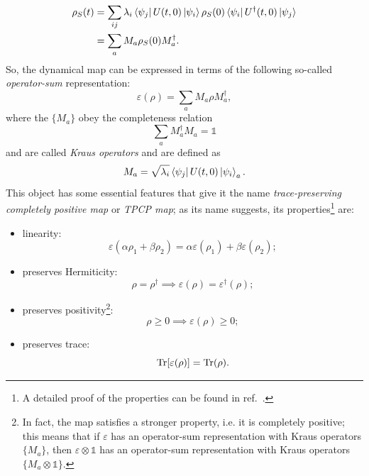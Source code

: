 \begin{equation}
\begin{split}
    \rho_S(t) &= \sum_{ij} \lambda_i \bra{\psi_j}U(t,0)\ket{\psi_i}\rho_S(0) \bra{\psi_i}U^\dagger(t,0)\ket{\psi_j}\\
                &= \sum_a M_a \rho_S(0) M_a^\dagger.
\end{split}
\end{equation}
So, the dynamical map can be expressed in terms of the following so-called \emph{operator-sum} representation:
\begin{equation}
    \varepsilon(\rho) = \sum_a M_a \rho M_a^\dagger,
\end{equation}
where the $\{M_a\}$ obey the completeness relation
\begin{equation}
\label{compl_rel_kraus}
    \sum_a M_a^\dagger M_a = \mathds{1}
\end{equation}
and are called \emph{Kraus operators} and are defined as
\begin{equation}
    M_a = \sqrt{\lambda_i} \bra{\psi_j}U(t,0)\ket{\psi_i}_a.
\end{equation}
This object has some essential features that give it the name \emph{trace-preserving completely positive map} or \emph{TPCP map}; as its name suggests, its properties\footnote{A detailed proof of the properties can be found in ref.~\cite{presk:quant_info}.} are:
\begin{itemize}
    \item linearity: 
    \begin{equation*}
        \varepsilon(\alpha\rho_1 + \beta\rho_2) = \alpha\varepsilon(\rho_1) + \beta\varepsilon(\rho_2);
    \end{equation*}
    \item preserves Hermiticity: 
    \begin{equation*}
        \rho = \rho^\dagger \implies \varepsilon(\rho) = \varepsilon^\dagger(\rho);
    \end{equation*}
    \item preserves positivity\footnote{In fact, the map satisfies a stronger property, i.e. it is completely positive; this means that if $\varepsilon$ has an operator-sum representation with Kraus operators $\{M_a\}$, then $\varepsilon \otimes \mathds{1}$ has an operator-sum representation with Kraus operators $\{M_a \otimes \mathds{1}\}$.}:
    \begin{equation*}
        \rho \geq 0 \implies \varepsilon(\rho) \geq 0;
    \end{equation*}
    \item preserves trace:
    \begin{equation*}
        \operatorname{Tr} [\varepsilon(\rho)] = \operatorname{Tr} (\rho).
    \end{equation*}
\end{itemize}

